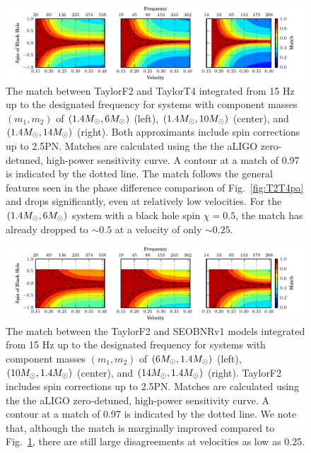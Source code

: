 \begin{figure}
\includegraphics[]{papers/nsbh_faithfulness/figure11.pdf}

\caption{\label{fig:F2T4ma} The match between TaylorF2 and TaylorT4
integrated from 15 Hz up to the designated frequency for systems with component
masses $(m_1, m_2)$ of $(1.4M_\odot, 6M_\odot)$ (left), $(1.4M_\odot, 10M_\odot)$
(center), and $(1.4M_\odot, 14M_\odot)$ (right).  Both approximants include spin corrections up to 2.5\ac{PN}.
Matches are calculated using the the aLIGO
zero-detuned, high-power sensitivity curve. A contour at a match of 0.97 is
indicated by the dotted line.  The match follows the general features seen in
the phase difference comparison of Fig.~\ref{fig:T2T4pa} and drops
significantly, even at relatively low velocities. For the $(1.4M_\odot, 6M_\odot)$ system with a black
hole spin $\chi = 0.5 $, the match has already dropped to $\sim 0.5$ at a velocity of only $\sim 0.25$.
}
\end{figure}


\begin{figure}
\includegraphics[]{papers/nsbh_faithfulness/figure12.pdf}

\caption{\label{fig:F2SEma} The match between the TaylorF2 and SEOBNRv1 models
integrated from 15 Hz up to the designated frequency for systems with component
masses $(m_1, m_2)$ of $(6M_\odot, 1.4M_\odot)$ (left), $(10M_\odot, 1.4M_\odot)$
(center), and $(14M_\odot, 1.4M_\odot)$ (right). TaylorF2 includes spin corrections up to 2.5\ac{PN}.
Matches are calculated using the the aLIGO
zero-detuned, high-power sensitivity curve. A contour at a match of 0.97 is
indicated by the dotted line. We note that, although the match is marginally
improved compared to Fig.~\ref{fig:F2T4ma}, there are still large
disagreements at velocities as low as 0.25.}

\end{figure}


